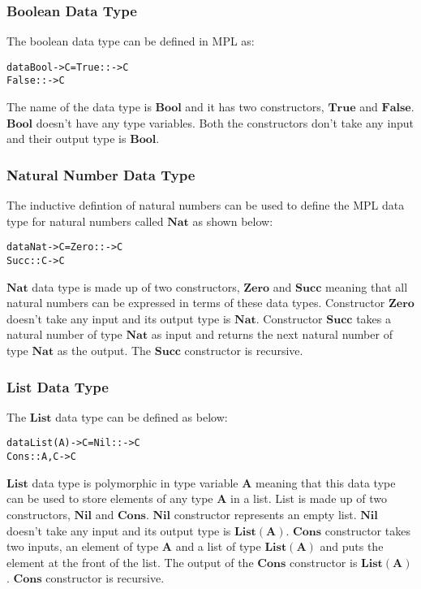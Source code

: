 \documentclass[11pt]{article}
\begin{document}
\subsubsection {Boolean Data Type}
The boolean data type can be defined in MPL as:
\begin{alltt}
          data Bool -> C = True  :: -> C 
                           False :: -> C
\end{alltt}
The name of the data type is $\mathbf{Bool}$ and it has two constructors, $\mathbf{True}$ and $\mathbf{False}$. $\mathbf{Bool}$ doesn't have any type variables. Both the constructors don't take any input and their output type is $\mathbf{Bool}$. 
\subsubsection {Natural Number Data Type} 
The inductive defintion of natural numbers can be used to define the MPL data type for natural numbers called $\mathbf{Nat}$ as shown below:
\begin{alltt}
          data Nat -> C = Zero  ::   -> C 
                          Succ  :: C -> C
\end{alltt}
$\mathbf{Nat}$ data type is made up of two constructors, $\mathbf{Zero}$ and $\mathbf{Succ}$ meaning that all natural numbers can be expressed in terms of these data types. Constructor $\mathbf{Zero}$ doesn't take any input and its output type is $\mathbf{Nat}$. Constructor $\mathbf{Succ}$ takes a natural number of type $\mathbf{Nat}$ as input and returns the next natural number of type $\mathbf{Nat}$ as the output. The $\mathbf{Succ}$ constructor is recursive.
\subsubsection {List Data Type}
The $\mathbf{List}$ data type can be defined as below:
\begin{alltt}
          data List(A) -> C = Nil   ::     -> C 
                              Cons  :: A,C -> C
\end{alltt}
$\mathbf{List}$ data type is polymorphic in type variable $\mathbf{A}$ meaning that this data type can be used to store elements of any type $\mathbf{A}$ in a list. List is made up of two constructors, $\mathbf{Nil}$ and $\mathbf{Cons}$. $\mathbf{Nil}$ constructor represents an empty list. $\mathbf{Nil}$ doesn't take any input and its output type is $\mathbf{List(A)}$. $\mathbf{Cons}$ constructor takes two inputs, an element of type $\mathbf{A}$ and a list of type $\mathbf{List(A)}$ and puts the element at the front of the list. The output of the $\mathbf{Cons}$ constructor is $\mathbf{List(A)}$. $\mathbf{Cons}$ constructor is recursive.
\end{document}
